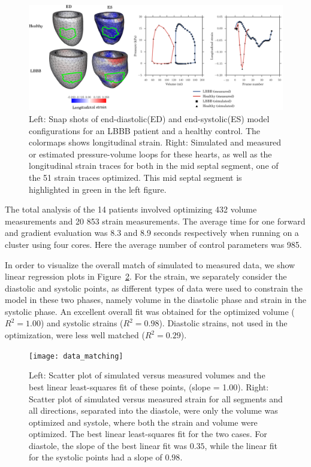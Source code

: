 \documentclass[times]{elsarticle}
\begin{document}
\begin{figure}[htbp]
  \centering
  \includegraphics[width=\textwidth]{generic_result}
  \caption{Left: Snap shots of end-diastolic(ED) and end-systolic(ES)
    model configurations for an LBBB patient and a healthy
    control. The colormaps shows longitudinal strain. Right: Simulated
    and measured or estimated pressure-volume loops for these hearts,
    as well as the longitudinal strain traces for both in the mid
    septal segment, one of the 51 strain traces optimized. This mid
    septal segment is highlighted in green in the left figure.}
  \label{fig:generic_result}
\end{figure}


The total analysis of the 14 patients involved optimizing 432 volume
measurements and 20 853 strain measurements. The average time for one
forward and gradient evaluation was 8.3 and 8.9 seconds respectively
when running on a cluster using four cores. Here the average number of
control parameters was 985.

In order to visualize the overall match of simulated to measured data,
we show linear regression plots in Figure~\ref{fig:data_matching}. For
the strain, we separately consider the diastolic and systolic points,
as different types of data were used to  constrain the model in these
two phases, namely volume in the diastolic phase and strain in the
systolic phase. An excellent overall fit was obtained for the optimized
volume ($R^2=1.00$) and systolic strains ($R^2=0.98$). 
Diastolic strains, not used in the optimization, were less well
matched ($R^2=0.29$). 

\begin{figure}[htbp]
  \centering
  \texttt{[image: data\_matching]}
  \caption{Left: Scatter plot of simulated versus
    measured volumes and the best linear least-squares fit of these
    points, (slope = 1.00). Right: Scatter plot of simulated versus
    measured strain for all segments and all directions, separated
    into the diastole, were only the volume was optimized and systole,
    where both the strain and volume were optimized. The best linear
    least-squares fit for the two cases. For diastole, the slope of
    the best linear fit was $0.35$, while the linear fit for the
    systolic points had a slope of $0.98$.}
  \label{fig:data_matching}
\end{figure}
\end{document}
